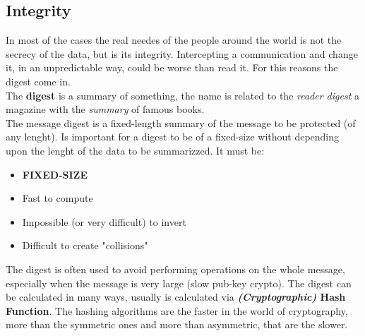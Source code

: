 \documentclass[12pt]{article}
\begin{document}
\subsection{Integrity}
In most of the cases the real needes of the people around the world is not the secrecy of the data, but is its integrity. Intercepting a communication and change it, in an unpredictable way, could be worse than read it. For this reasons the digest come in.\\
The \textbf{digest} is a summary of something, the name is related to the \textit{reader digest} a magazine with the \textit{summary} of famous books.\\
The message digest is a fixed-length summary of the message to be protected (of any lenght). Is important for a digest to be of a fixed-size without depending upon the lenght of the data to be summarizzed. It must be:
\begin{itemize}
  \item \textbf{FIXED-SIZE}
  \item Fast to compute
  \item Impossible (or very difficult) to invert
  \item Difficult to create "collisions"
\end{itemize}
The digest is often used to avoid performing operations on the whole message, especially when the message is very large (slow pub-key crypto). The digest can be calculated in many ways, usually is calculated via \textbf{\textit{(Cryptographic)} Hash Function}.
The hashing algorithms are the faster in the world of cryptography, more than the symmetric ones and more than asymmetric, that are the slower.\\
\end{document}

